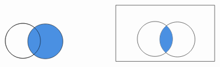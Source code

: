 \documentclass[12pt]{article}
\begin{document}
\[\begin{tikzpicture}[x=0.75pt,y=0.75pt,yscale=-1,xscale=1]
    \draw   (299.19,191.83) .. controls (299.19,176.47) and (311.65,164.01) .. (327.01,164.01) .. controls (342.37,164.01) and (354.83,176.47) .. (354.83,191.83) .. controls (354.83,207.19) and (342.37,219.65) .. (327.01,219.65) .. controls (311.65,219.65) and (299.19,207.19) .. (299.19,191.83) -- cycle ;
    \draw  [fill={rgb, 255:red, 74; green, 144; blue, 226 }  ,fill opacity=1 ] (334.74,192.6) .. controls (334.74,177.24) and (347.19,164.79) .. (362.55,164.79) .. controls (377.92,164.79) and (390.37,177.24) .. (390.37,192.6) .. controls (390.37,207.96) and (377.92,220.42) .. (362.55,220.42) .. controls (347.19,220.42) and (334.74,207.96) .. (334.74,192.6) -- cycle ;
    \draw   (299.19,191.83) .. controls (299.19,176.47) and (311.65,164.01) .. (327.01,164.01) .. controls (342.37,164.01) and (354.83,176.47) .. (354.83,191.83) .. controls (354.83,207.19) and (342.37,219.65) .. (327.01,219.65) .. controls (311.65,219.65) and (299.19,207.19) .. (299.19,191.83) -- cycle ;
    \draw   (474,135.09) -- (630.53,135.09) -- (630.53,224.54) -- (474,224.54) -- cycle ;
    \draw   (508.19,188.83) .. controls (508.19,173.47) and (520.65,161.01) .. (536.01,161.01) .. controls (551.37,161.01) and (563.83,173.47) .. (563.83,188.83) .. controls (563.83,204.19) and (551.37,216.65) .. (536.01,216.65) .. controls (520.65,216.65) and (508.19,204.19) .. (508.19,188.83) -- cycle ;
    \draw   (543.74,189.6) .. controls (543.74,174.24) and (556.19,161.79) .. (571.55,161.79) .. controls (586.92,161.79) and (599.37,174.24) .. (599.37,189.6) .. controls (599.37,204.96) and (586.92,217.42) .. (571.55,217.42) .. controls (556.19,217.42) and (543.74,204.96) .. (543.74,189.6) -- cycle ;
    \draw  [draw opacity=0][fill={rgb, 255:red, 74; green, 144; blue, 226 }  ,fill opacity=1 ] (563.83,188.83) .. controls (563.83,197.65) and (559.72,205.51) .. (553.32,210.61) .. controls (547.45,205.51) and (543.74,197.99) .. (543.74,189.6) .. controls (543.74,180.78) and (547.84,172.92) .. (554.25,167.82) .. controls (560.12,172.92) and (563.83,180.44) .. (563.83,188.83) -- cycle ;
    

\end{tikzpicture}\]
\end{document}
